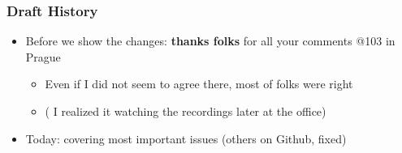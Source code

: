 \documentclass[11pt,show 
notes,notheorems,noamsthm,blank]{beamer} %
\begin{document}
\begin{frame}
\frametitle{Draft History}


\begin{itemize}

% 
%     
% 
% 


\item Before we show the changes: \textbf{thanks folks }for all your comments @103 in Prague

\begin{itemize}
  \item Even if I did not seem to agree there, most of folks were right
    \item ( I realized it watching the recordings later at the office)
  \end{itemize}

\item Today: covering most important  issues (others on Github, fixed)

\end{itemize}
\end{frame}
\end{document}
